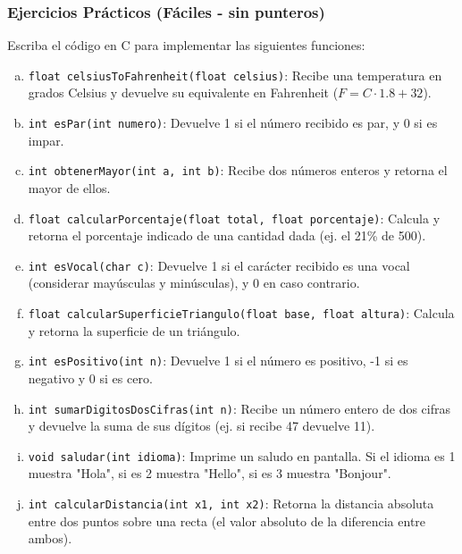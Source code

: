 \begin{ejercicioClase}
    \subsubsection{Ejercicios Prácticos (Fáciles - sin punteros)}
    Escriba el código en C para implementar las siguientes funciones:
    \begin{enumerate}[a)]
        \item \texttt{float celsiusToFahrenheit(float celsius)}: Recibe una temperatura en grados Celsius y devuelve su equivalente en Fahrenheit ($F = C \cdot 1.8 + 32$).
        \item \texttt{int esPar(int numero)}: Devuelve 1 si el número recibido es par, y 0 si es impar.
        \item \texttt{int obtenerMayor(int a, int b)}: Recibe dos números enteros y retorna el mayor de ellos.
        \item \texttt{float calcularPorcentaje(float total, float porcentaje)}: Calcula y retorna el porcentaje indicado de una cantidad dada (ej. el 21\% de 500).
        \item \texttt{int esVocal(char c)}: Devuelve 1 si el carácter recibido es una vocal (considerar mayúsculas y minúsculas), y 0 en caso contrario.
        \item \texttt{float calcularSuperficieTriangulo(float base, float altura)}: Calcula y retorna la superficie de un triángulo.
        \item \texttt{int esPositivo(int n)}: Devuelve 1 si el número es positivo, -1 si es negativo y 0 si es cero.
        \item \texttt{int sumarDigitosDosCifras(int n)}: Recibe un número entero de dos cifras y devuelve la suma de sus dígitos (ej. si recibe 47 devuelve 11).
        \item \texttt{void saludar(int idioma)}: Imprime un saludo en pantalla. Si el idioma es 1 muestra "Hola", si es 2 muestra "Hello", si es 3 muestra "Bonjour".
        \item \texttt{int calcularDistancia(int x1, int x2)}: Retorna la distancia absoluta entre dos puntos sobre una recta (el valor absoluto de la diferencia entre ambos).
    \end{enumerate}


\end{ejercicioClase}
